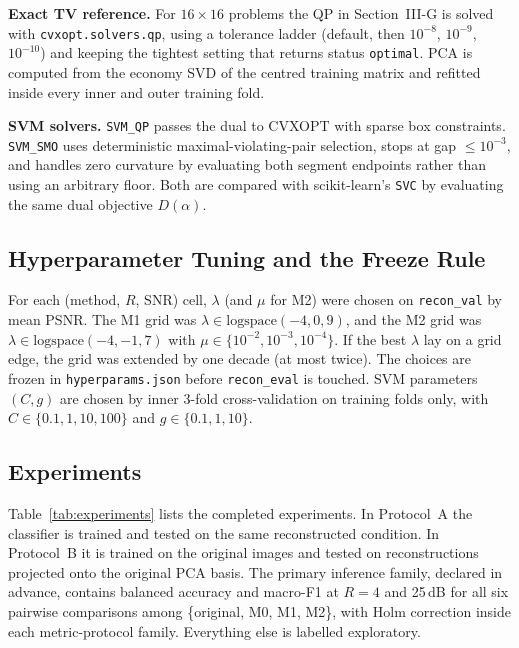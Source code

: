 \documentclass[conference,a4paper]{IEEEtran}
\begin{document}
\textbf{Exact TV reference.} For $16\times16$ problems the QP in Section~III-G is solved with \texttt{cvxopt.solvers.qp}, using a tolerance ladder (default, then $10^{-8}$, $10^{-9}$, $10^{-10}$) and keeping the tightest setting that returns status \texttt{optimal}. PCA is computed from the economy SVD of the centred training matrix and refitted inside every inner and outer training fold.

\textbf{SVM solvers.} \texttt{SVM\_QP} passes the dual to CVXOPT with sparse box constraints. \texttt{SVM\_SMO} uses deterministic maximal-violating-pair selection, stops at gap $\le10^{-3}$, and handles zero curvature by evaluating both segment endpoints rather than using an arbitrary floor. Both are compared with scikit-learn's \texttt{SVC} by evaluating the same dual objective $D(\alpha)$.

\subsection{Hyperparameter Tuning and the Freeze Rule}
For each (method, $R$, SNR) cell, $\lambda$ (and $\mu$ for M2) were chosen on \texttt{recon\_val} by mean PSNR. The M1 grid was $\lambda\in\mathrm{logspace}(-4,0,9)$, and the M2 grid was $\lambda\in\mathrm{logspace}(-4,-1,7)$ with $\mu\in\{10^{-2},10^{-3},10^{-4}\}$. If the best $\lambda$ lay on a grid edge, the grid was extended by one decade (at most twice). The choices are frozen in \texttt{hyperparams.json} before \texttt{recon\_eval} is touched. SVM parameters $(C,g)$ are chosen by inner 3-fold cross-validation on training folds only, with $C\in\{0.1,1,10,100\}$ and $g\in\{0.1,1,10\}$.

\subsection{Experiments}
Table~\ref{tab:experiments} lists the completed experiments. In Protocol~A the classifier is trained and tested on the same reconstructed condition. In Protocol~B it is trained on the original images and tested on reconstructions projected onto the original PCA basis. The primary inference family, declared in advance, contains balanced accuracy and macro-F1 at $R=4$ and 25\,dB for all six pairwise comparisons among \{original, M0, M1, M2\}, with Holm correction inside each metric-protocol family. Everything else is labelled exploratory.
\end{document}
